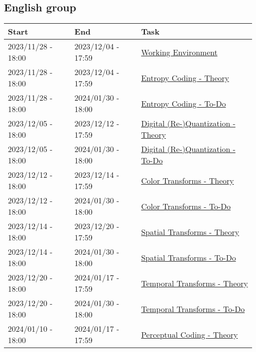\subsection{English group}
\begin{tabular}{|l|l|l|}
  \hline
  Start & End & Task \\
  \hline
  2023/11/28 - 18:00 & 2023/12/04 - 17:59 & \href{https://sistemas-multimedia.github.io/contents/working_environment/}{Working Environment} \\
  2023/11/28 - 18:00 & 2023/12/04 - 17:59 & \href{https://sistemas-multimedia.github.io/contents/entropy_coding/}{Entropy Coding - Theory} \\
  2023/11/28 - 18:00 & 2024/01/30 - 18:00 & \href{https://sistemas-multimedia.github.io/contents/entropy_coding/#x1-110007}{Entropy Coding - To-Do} \\
  2023/12/05 - 18:00 & 2023/12/12 - 17:59 & \href{https://sistemas-multimedia.github.io/contents/quantization/}{Digital (Re-)Quantization - Theory} \\
  2023/12/05 - 18:00 & 2024/01/30 - 18:00 & \href{https://sistemas-multimedia.github.io/contents/quantization/#x1-150008}{Digital (Re-)Quantization - To-Do} \\
  2023/12/12 - 18:00 & 2023/12/14 - 17:59 & \href{https://sistemas-multimedia.github.io/contents/color_transforms/}{Color Transforms - Theory} \\
  2023/12/12 - 18:00 & 2024/01/30 - 18:00 & \href{https://sistemas-multimedia.github.io/contents/color_transforms/#x1-100006}{Color Transforms - To-Do} \\
  2023/12/14 - 18:00 & 2023/12/20 - 17:59 & \href{https://sistemas-multimedia.github.io/contents/spatial_transforms/}{Spatial Transforms - Theory} \\
  2023/12/14 - 18:00 & 2024/01/30 - 18:00 & \href{https://sistemas-multimedia.github.io/contents/spatial_transforms/#x1-80006}{Spatial Transforms - To-Do} \\
  2023/12/20 - 18:00 & 2024/01/17 - 17:59 & \href{https://sistemas-multimedia.github.io/contents/temporal_transforms/}{Temporal Transforms - Theory} \\
  2023/12/20 - 18:00 & 2024/01/30 - 18:00 & \href{https://sistemas-multimedia.github.io/contents/temporal_transforms/#x1-90008}{Temporal Transforms - To-Do} \\
  2024/01/10 - 18:00 & 2024/01/17 - 17:59 & \href{https://sistemas-multimedia.github.io/contents/perceptual_coding/}{Perceptual Coding - Theory} \\

\end{tabular}
